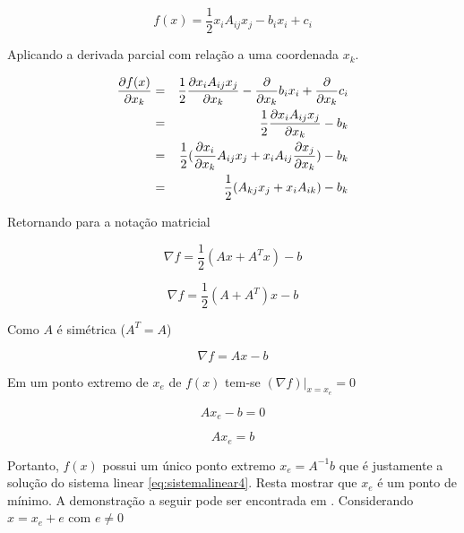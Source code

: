 \begin{equation} \label{eq:quadratica_ind}
    f(x) = \frac{1}{2} x_i A_{ij} x_j - b_i x_i + c_i
\end{equation}


Aplicando a derivada parcial com relação a uma coordenada $x_k$.


\begin{eqnarray}
     \dxk[f(x)] & = & \frac{1}{2} \dxk[ x_i A_{ij} x_j ]- \dxk{b_i x_i}+ \dxk{c_i} \\
                & = & \frac{1}{2} \dxk[ x_i A_{ij} x_j ]- b_k \\
                & = & \frac{1}{2} (\dxk[ x_i ]A_{ij} x_j  + x_i A_{ij} \dxk[x_j]) - b_k \\
                & = & \frac{1}{2}(A_{kj} x_j  + x_i A_{ik})  - b_k
\end{eqnarray}


Retornando para a notação matricial


\begin{equation}
    \nabla f = \frac{1}{2} (Ax + A^T x) - b
\end{equation}


\begin{equation}
    \nabla f = \frac{1}{2} (A + A^T) x - b
\end{equation}

Como $A$ é simétrica ($A^T = A$)

\begin{equation} \label{eq:gradf}
    \nabla f = A x - b
\end{equation}

Em um ponto extremo de  $ x_e$ de $f(x)$ tem-se $(\nabla f)|_{x=x_e} = 0 $

\begin{equation}
    Ax_e - b = 0
\end{equation}

\begin{equation}
    Ax_e = b
\end{equation}

Portanto, $f(x)$ possui um único ponto extremo $x_e = A^{-1}b$ que é justamente a solução do sistema linear \eqref{eq:sistemalinear4}. Resta mostrar que $x_e$ é um ponto de mínimo. A demonstração a seguir pode ser encontrada em \citet{Shewchuk94anintroduction}. Considerando $x = x_e + e$ com $e \neq 0 $


